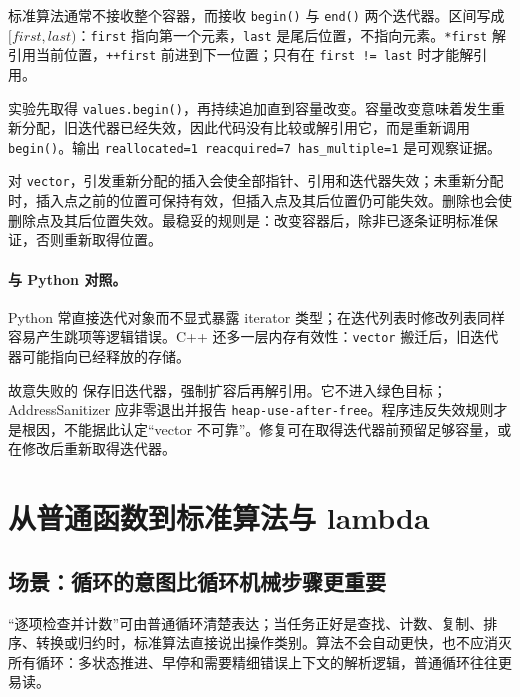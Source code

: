 标准算法通常不接收整个容器，而接收 \texttt{begin()} 与 \texttt{end()} 两个迭代器。区间写成 \([first,last)\)：\texttt{first} 指向第一个元素，\texttt{last} 是尾后位置，不指向元素。\texttt{*first} 解引用当前位置，\texttt{++first} 前进到下一位置；只有在 \texttt{first != last} 时才能解引用。



实验先取得 \texttt{values.begin()}，再持续追加直到容量改变。容量改变意味着发生重新分配，旧迭代器已经失效，因此代码没有比较或解引用它，而是重新调用 \texttt{begin()}。输出 \texttt{reallocated=1 reacquired=7 has\_multiple=1} 是可观察证据。

对 \texttt{vector}，引发重新分配的插入会使全部指针、引用和迭代器失效；未重新分配时，插入点之前的位置可保持有效，但插入点及其后位置仍可能失效。删除也会使删除点及其后位置失效。最稳妥的规则是：改变容器后，除非已逐条证明标准保证，否则重新取得位置。

\paragraph{与 Python 对照。}
Python 常直接迭代对象而不显式暴露 iterator 类型；在迭代列表时修改列表同样容易产生跳项等逻辑错误。C++ 还多一层内存有效性：\texttt{vector} 搬迁后，旧迭代器可能指向已经释放的存储。

故意失败的  保存旧迭代器，强制扩容后再解引用。它不进入绿色目标；AddressSanitizer 应非零退出并报告 \texttt{heap-use-after-free}。程序违反失效规则才是根因，不能据此认定“vector 不可靠”。修复可在取得迭代器前预留足够容量，或在修改后重新取得迭代器。

\section{从普通函数到标准算法与 lambda}

\subsection{场景：循环的意图比循环机械步骤更重要}

“逐项检查并计数”可由普通循环清楚表达；当任务正好是查找、计数、复制、排序、转换或归约时，标准算法直接说出操作类别。算法不会自动更快，也不应消灭所有循环：多状态推进、早停和需要精细错误上下文的解析逻辑，普通循环往往更易读。



